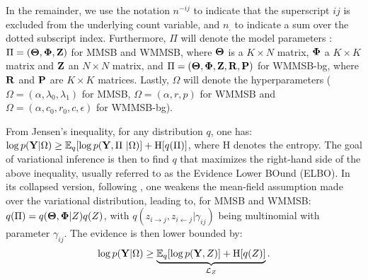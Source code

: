 In the remainder, we use the notation $n^{-ij}$ to indicate that the superscript $ij$ is excluded from the underlying count variable, and $n_{\bm{.}}$ to indicate a sum over the dotted subscript index. Furthermore, $\Pi$ will denote the model parameters : $\Pi = (\boldsymbol{\Theta},\boldsymbol{\Phi},\mathbf{Z})$ for MMSB and WMMSB, where $\boldsymbol{\Theta}$ is a $K \times N$ matrix, $\boldsymbol{\Phi}$ a $K \times K$ matrix and $\mathbf{Z}$ an $N \times N$ matrix, and $\Pi = (\boldsymbol{\Theta},\boldsymbol{\Phi},\mathbf{Z},\mathbf{R},\mathbf{P})$ for WMMSB-bg, where $\mathbf{R}$ and $\mathbf{P}$ are $K \times K$ matrices. Lastly, $\Omega$ will denote the hyperparameters ($\Omega = (\alpha,\lambda_0,\lambda_1)$ for MMSB, $\Omega = (\alpha,r,p)$ for WMMSB and $\Omega = (\alpha, c_0, r_0, c, \epsilon)$ for WMMSB-bg).

From Jensen's inequality, for any distribution $q$, one has: $\log p({\mathbf{Y}} | \Omega) \ge \mathbb{E}_{q}[\log p({\mathbf{Y}}, \Pi\ | \Omega)] + \textrm{H}[q(\Pi)]$,
where $\textrm{H}$ denotes the entropy. The goal of variational inference is then to find $q$ that maximizes the right-hand side of the above inequality, usually referred to as the Evidence Lower BOund (ELBO). In its collapsed version, following \cite{teh2007collapsed}, one weakens the mean-field assumption made over the variational distribution, leading to, for MMSB and WMMSB: $q(\Pi) = q({\boldsymbol{\Theta}}, {\boldsymbol{\Phi}} | Z) q(Z)$,
with $q(z_{i \rightarrow j}, z_{i \leftarrow j}|\gamma_{ij})$ being multinomial with parameter $\gamma_{ij}$. The evidence is then lower bounded by:
%
\begin{equation*}
\log p({\mathbf{Y}}|\Omega) \geq \underbrace{\mathbb{E}_{q}[\log p({\mathbf{Y}}, Z)] + \textrm{H}[q(Z)]}_{\mathcal{L}_Z}.
\end{equation*}

